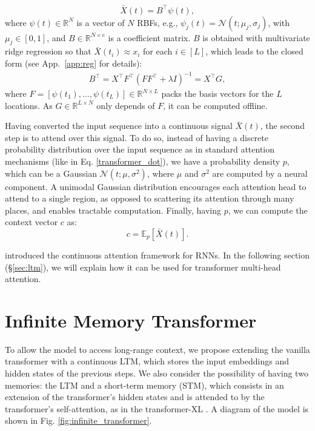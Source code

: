 \documentclass[11pt]{article}
\begin{document}
\begin{equation}\label{eq:continuous_embeddings}
    \bar{X}(t)=B^\top \psi(t),
\end{equation}
where ${\psi(t) \in \mathbb{R}^N}$ is a vector of $N$ RBFs, e.g., $\psi_j(t) = \mathcal{N}(t; \mu_j, \sigma_j)$, with $\mu_j \in [0,1]$, and ${B \in \mathbb{R}^{N\times e}}$ is a coefficient matrix. $B$ is obtained with multivariate ridge regression \citep{brown1980adaptive} so that ${\bar{X}(t_i) \approx x_i}$ for each $i \in [L]$, which leads to the closed form (see App.~\ref{app:reg} for details):
\begin{align}\label{eq:B}
    B^\top = X^\top F^\top (FF^\top + \lambda I)^{-1} = X^\top G,
\end{align}
where ${F=[\psi(t_1),\dots,\psi(t_L)]\in \mathbb{R}^{ N\times L}}$ packs the basis vectors for the $L$ locations. As ${G \in \mathbb{R}^{L\times N}}$ only depends of $F$, it can be computed offline.

Having converted the input sequence into a continuous signal $\bar{X}(t)$, the second step is to attend over this signal. To do so, instead of having a discrete probability distribution over the input sequence as in standard attention mechanisms (like in Eq. \ref{transformer_dot}), we have a probability density $p$, which can be a Gaussian ${\mathcal{N}(t; \mu, \sigma^2)}$, where $\mu$ and $\sigma^2$ are computed by a neural component. A unimodal Gaussian distribution encourages each attention head to attend to a single region, as opposed to scattering its attention through many places, and enables tractable computation.
Finally, having $p$, we can compute the context vector $c$ as:
\begin{equation}
\label{eq:context}
c=\mathbb{E}_{p}\left[\bar{X}(t)\right].
\end{equation}

\citet{martins2020sparse} introduced the continuous attention framework for RNNs. In the following section (\S\ref{sec:ltm}), we will explain how it can be used for transformer multi-head attention.

\section{Infinite Memory Transformer}
To allow the model to access long-range context, we propose extending the vanilla transformer with a continuous LTM, which stores the input embeddings and hidden states of the previous steps. 
We also consider the possibility of having two memories: the LTM and a short-term memory (STM), which consists in an extension of the transformer's hidden states and is attended to by the transformer's self-attention, as in the transformer-XL \citep{dai2019transformer}.
A diagram of the model is shown in Fig. \ref{fig:infinite_transformer}. 
\end{document}
